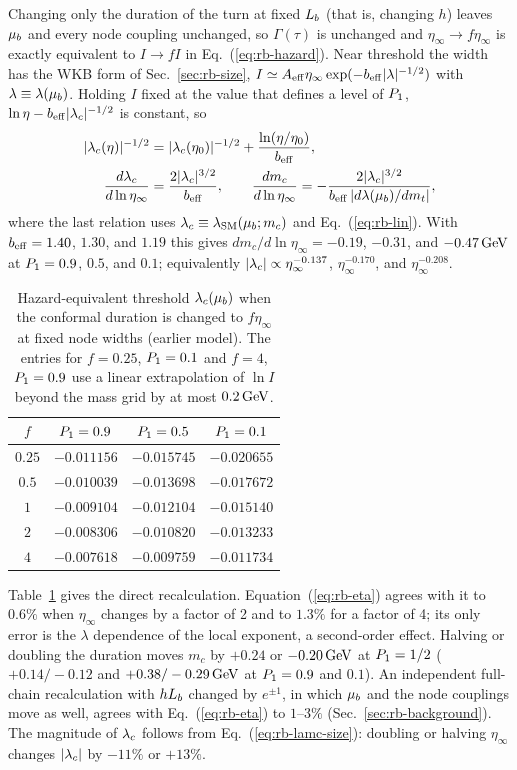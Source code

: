 Changing only the duration of the turn at fixed $L_b$ (that is, changing $h$) leaves $\mu_b$ and every node coupling unchanged, so $\Gamma(\tau)$ is unchanged and $\eta_\infty\to f\eta_\infty$ is exactly equivalent to $I\to fI$ in Eq.~(\ref{eq:rb-hazard}).
Near threshold the width has the WKB form of Sec.~\ref{sec:rb-size}, $I\simeq A_{\rm eff}\eta_\infty\exp(-b_{\rm eff}|\lambda|^{-1/2})$ with $\lambda\equiv\lambda(\mu_b)$.
Holding $I$ fixed at the value that defines a level of $P_1$, $\ln\eta-b_{\rm eff}|\lambda_c|^{-1/2}$ is constant, so
\begin{align}
|\lambda_c(\eta)|^{-1/2}&=|\lambda_c(\eta_0)|^{-1/2}+\frac{\ln(\eta/\eta_0)}{b_{\rm eff}},\nonumber\\
\frac{d\lambda_c}{d\ln\eta_\infty}&=\frac{2|\lambda_c|^{3/2}}{b_{\rm eff}},\qquad
\frac{dm_c}{d\ln\eta_\infty}=-\frac{2|\lambda_c|^{3/2}}{b_{\rm eff}\,|d\lambda(\mu_b)/dm_t|},
\label{eq:rb-eta}
\end{align}
where the last relation uses $\lambda_c\equiv\lambda_{\rm SM}(\mu_b;m_c)$ and Eq.~(\ref{eq:rb-lin}).
With $b_{\rm eff}=1.40$, $1.30$, and $1.19$ this gives $dm_c/d\ln\eta_\infty=-0.19$, $-0.31$, and $-0.47\,\mathrm{GeV}$ at $P_1=0.9$, $0.5$, and $0.1$; equivalently $|\lambda_c|\propto\eta_\infty^{-0.137}$, $\eta_\infty^{-0.170}$, and $\eta_\infty^{-0.208}$. %

\begin{table}[t]
\centering
\caption{Hazard-equivalent threshold $\lambda_c(\mu_b)$ when the conformal duration is changed to $f\eta_\infty$ at fixed node widths (earlier model).
The entries for $f=0.25$, $P_1=0.1$ and $f=4$, $P_1=0.9$ use a linear extrapolation of $\ln I$ beyond the mass grid by at most $0.2\,\mathrm{GeV}$.} %
\label{tab:rb-eta}
\begin{tabular}{cccc}
\toprule
$f$ & $P_1=0.9$ & $P_1=0.5$ & $P_1=0.1$ \\
\midrule
$0.25$ & $-0.011156$ & $-0.015745$ & $-0.020655$ \\ %
$0.5$ & $-0.010039$ & $-0.013698$ & $-0.017672$ \\ %
$1$ & $-0.009104$ & $-0.012104$ & $-0.015140$ \\ %
$2$ & $-0.008306$ & $-0.010820$ & $-0.013233$ \\ %
$4$ & $-0.007618$ & $-0.009759$ & $-0.011734$ \\ %
\bottomrule
\end{tabular}
\end{table}

Table~\ref{tab:rb-eta} gives the direct recalculation.
Equation~(\ref{eq:rb-eta}) agrees with it to $0.6\%$ when $\eta_\infty$ changes by a factor of 2 and to $1.3\%$ for a factor of 4; its only error is the $\lambda$ dependence of the local exponent, a second-order effect. %
Halving or doubling the duration moves $m_c$ by $+0.24$ or $-0.20\,\mathrm{GeV}$ at $P_1=1/2$ ($+0.14/-0.12$ and $+0.38/-0.29\,\mathrm{GeV}$ at $P_1=0.9$ and $0.1$). %
An independent full-chain recalculation with $hL_b$ changed by $e^{\pm1}$, in which $\mu_b$ and the node couplings move as well, agrees with Eq.~(\ref{eq:rb-eta}) to $1$--$3\%$ (Sec.~\ref{sec:rb-background}). %
The magnitude of $\lambda_c$ follows from Eq.~(\ref{eq:rb-lamc-size}): doubling or halving $\eta_\infty$ changes $|\lambda_c|$ by $-11\%$ or $+13\%$. %

